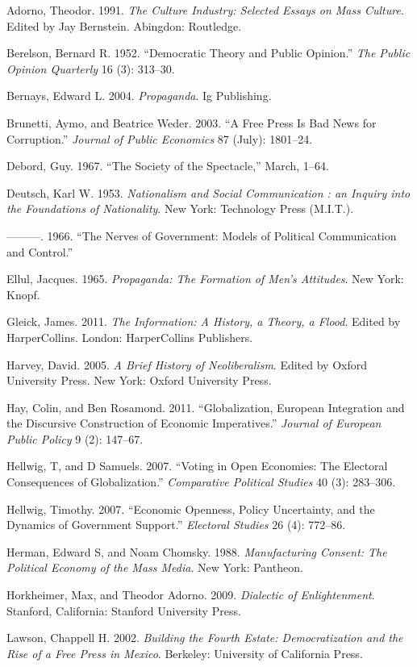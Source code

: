 \documentclass[12pt,book]{article}
\begin{document}
Adorno, Theodor. 1991. \emph{The Culture Industry: Selected Essays on
Mass Culture}. Edited by Jay Bernstein. Abingdon: Routledge.

Berelson, Bernard R. 1952. ``Democratic Theory and Public Opinion.''
\emph{The Public Opinion Quarterly} 16 (3): 313--30.

Bernays, Edward L. 2004. \emph{Propaganda}. Ig Publishing.

Brunetti, Aymo, and Beatrice Weder. 2003. ``A Free Press Is Bad News for
Corruption.'' \emph{Journal of Public Economics} 87 (July): 1801--24.

Debord, Guy. 1967. ``The Society of the Spectacle,'' March, 1--64.

Deutsch, Karl W. 1953. \emph{Nationalism and Social Communication : an
Inquiry into the Foundations of Nationality}. New York: Technology Press
(M.I.T.).

---------. 1966. ``The Nerves of Government: Models of Political
Communication and Control.''

Ellul, Jacques. 1965. \emph{Propaganda: The Formation of Men's
Attitudes}. New York: Knopf.

Gleick, James. 2011. \emph{The Information: A History, a Theory, a
Flood}. Edited by HarperCollins. London: HarperCollins Publishers.

Harvey, David. 2005. \emph{A Brief History of Neoliberalism}. Edited by
Oxford University Press. New York: Oxford University Press.

Hay, Colin, and Ben Rosamond. 2011. ``Globalization, European
Integration and the Discursive Construction of Economic Imperatives.''
\emph{Journal of European Public Policy} 9 (2): 147--67.

Hellwig, T, and D Samuels. 2007. ``Voting in Open Economies: The
Electoral Consequences of Globalization.'' \emph{Comparative Political
Studies} 40 (3): 283--306.

Hellwig, Timothy. 2007. ``Economic Openness, Policy Uncertainty, and the
Dynamics of Government Support.'' \emph{Electoral Studies} 26 (4):
772--86.

Herman, Edward S, and Noam Chomsky. 1988. \emph{Manufacturing Consent:
The Political Economy of the Mass Media}. New York: Pantheon.

Horkheimer, Max, and Theodor Adorno. 2009. \emph{Dialectic of
Enlightenment}. Stanford, California: Stanford University Press.

Lawson, Chappell H. 2002. \emph{Building the Fourth Estate:
Democratization and the Rise of a Free Press in Mexico}. Berkeley:
University of California Press.
\end{document}
